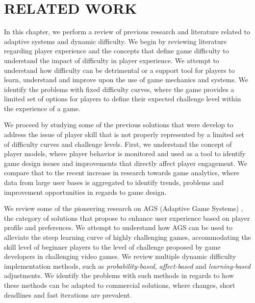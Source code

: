 \chapter{RELATED WORK}
\label{ch:related-work}



In this chapter, we perform a review of previous research and literature related to adaptive systems and dynamic difficulty. We begin by reviewing literature regarding player experience and the concepts that define game difficulty to understand the impact of difficulty in player experience. We attempt to understand how difficulty can be detrimental or a support tool for players to learn, understand and improve upon the use of game mechanics and systems. We identify the problems with fixed difficulty curves, where the game provides a limited set of options for players to define their expected challenge level within the experience of a game. 

We proceed by studying some of the previous solutions that were develop to address the issue of player skill that is not properly represented by a limited set of difficulty curves and challenge levels. First, we understand the concept of player models, where player behavior is monitored and used as a tool to identify game design issues and improvements that directly affect player engagement. We compare that to the recent increase in research towards game analytics, where data from large user bases is aggregated to identify trends, problems and improvement opportunities in regards to game design.

We review some of the pioneering research on AGS (Adaptive Game Systems) \cite{ARTICLE_PlayerCentredGameDesign}, the category of solutions that propose to enhance user experience based on player profile and preferences. We attempt to understand how AGS can be used to alleviate the steep learning curve of highly challenging games, accommodating the skill level of beginner players to the level of challenge proposed by game developers in challenging video games. We review multiple dynamic difficulty implementation methods, such as \emph{probability-based}, \emph{affect-based} and \emph{learning-based} adjustments. We identify the problems with such methods in regards to how these methods can be adapted to commercial solutions, where changes, short deadlines and fast iterations are prevalent.

